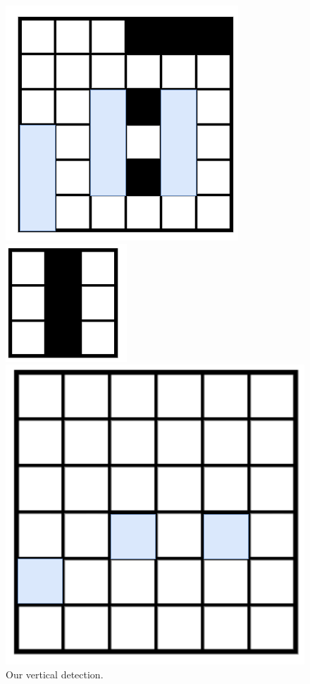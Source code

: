         \begin{figure}[ht]
            \begin{minipage}{.35\textwidth}
              \centering
              \includegraphics[width=.35\linewidth]{images/convolutional_neural_networks_images/vertical_detection.png}
            \end{minipage}
            \begin{minipage}{.25\textwidth}
                \centering
                \includegraphics[width=.25\linewidth]{images/convolutional_neural_networks_images/vertical_filter.png}
                \caption*{$\mathlarger{\mathlarger{\mathlarger{\mathlarger{\mathlarger{\implies}}}}}$}
            \end{minipage}
            \begin{minipage}{.35\textwidth}
                \centering
                \includegraphics[width=.35\linewidth]{images/convolutional_neural_networks_images/vertical_channel.png}
            \end{minipage}
            \caption*{Our vertical detection.}
        \end{figure}

